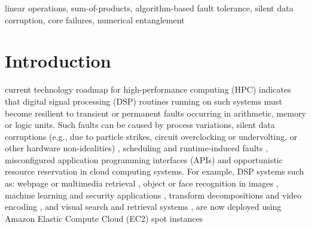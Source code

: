 \documentclass[twocolumn,english,onecolumn]{IEEEtran}
\theoremstyle{plain}
\theoremstyle{plain}
\begin{document}
\begin{IEEEkeywords}
linear operations, sum-of-products, algorithm-based fault tolerance,
silent data corruption, core failures, numerical entanglement
\end{IEEEkeywords}


\section{Introduction}

 current technology roadmap for high-performance
computing (HPC) indicates that digital signal processing (DSP) routines
running on such systems must become resilient to transient or permanent
faults occurring in arithmetic, memory or logic units. Such faults
can be caused by process variations, silent data corruptions (e.g.,
due to particle strikes, circuit overclocking or undervolting, or
other hardware non-idealities) \cite{nicolaidis2012design}, scheduling
and runtime-induced faults \cite{AndreopoulosTMM_PlentyOfRoom}, misconfigured
application programming interfaces (APIs) \cite{lu2013cloud} and
opportunistic resource reservation \cite{poola2014fault} in cloud
computing systems. For example, DSP systems such as: webpage or multimedia
retrieval \cite{carterette2009million}, object or face recognition
in images \cite{yang2004two}, machine learning and security applications
\cite{bradski2008learning}, transform decompositions and video encoding
\cite{andreopoulos2000hybrid,andreopoulos2002new,andreopoulos2001local,munteanu2003control,andreopoulos2003high,andreopoulos2007adaptive,kontorinis2009statistical,foo2008analytical,barbarien2004scalable},
and visual search and retrieval systems \cite{jegou2012aggregating},
are now deployed using Amazon Elastic Compute Cloud (EC2) spot instances
\end{document}
